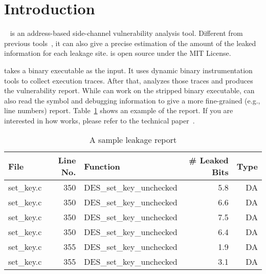 
\section*{Introduction}

\tool{}~\cite{bao2021abacus} is an address-based side-channel vulnerability analysis tool. Different from previous tools~\cite{203878,236338,182946}, it can also give a precise estimation of the amount of the leaked information for each leakage site. \tool{} is open source under the MIT License. 



\tool{} takes a binary executable as the input. It uses dynamic binary instrumentation tools to collect execution traces. After that, \tool{} analyzes those traces and produces the vulnerability report. While \tool{} can work on the stripped binary executable, \tool{} can also read the symbol and debugging information to give a more fine-grained (e.g., line numbers) report. Table~\ref{tab:DESOpenSSL1.1.1} shows an example of the report. If you are interested in how \tool{} works, please refer to the technical paper~\cite{bao2021abacus}.


\begin{table}[h!]
\centering\tiny\scriptsize
\caption{A sample leakage report}\label{tab:DESOpenSSL1.1.1}
\begin{tabular}{lrlrr}
\toprule
\textbf{File} & \textbf{Line No.} & \textbf{Function} & \textbf{\# Leaked Bits} & \textbf{Type} \\\toprule
set\_key.c& 350&DES\_set\_key\_unchecked&5.8 &DA\\
set\_key.c& 350&DES\_set\_key\_unchecked&6.6 &DA\\
set\_key.c& 350&DES\_set\_key\_unchecked&7.5 &DA\\
set\_key.c& 350&DES\_set\_key\_unchecked&6.4 &DA\\
set\_key.c& 355&DES\_set\_key\_unchecked&1.9 &DA\\
set\_key.c& 355&DES\_set\_key\_unchecked&3.1 &DA\\
\bottomrule
\end{tabular}
\end{table}


